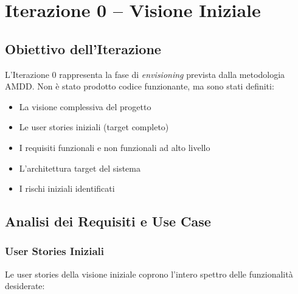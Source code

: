 \documentclass[a4paper,12pt]{report}
\begin{document}
\chapter{Iterazione 0 -- Visione Iniziale}

\section{Obiettivo dell'Iterazione}

L'Iterazione 0 rappresenta la fase di \textit{envisioning} prevista dalla metodologia AMDD. Non è stato prodotto codice funzionante, ma sono stati definiti:
\begin{itemize}
    \item La visione complessiva del progetto
    \item Le user stories iniziali (target completo)
    \item I requisiti funzionali e non funzionali ad alto livello
    \item L'architettura target del sistema
    \item I rischi iniziali identificati
\end{itemize}

\section{Analisi dei Requisiti e Use Case}

\subsection{User Stories Iniziali}

Le user stories della visione iniziale coprono l'intero spettro delle funzionalità desiderate:
\end{document}
